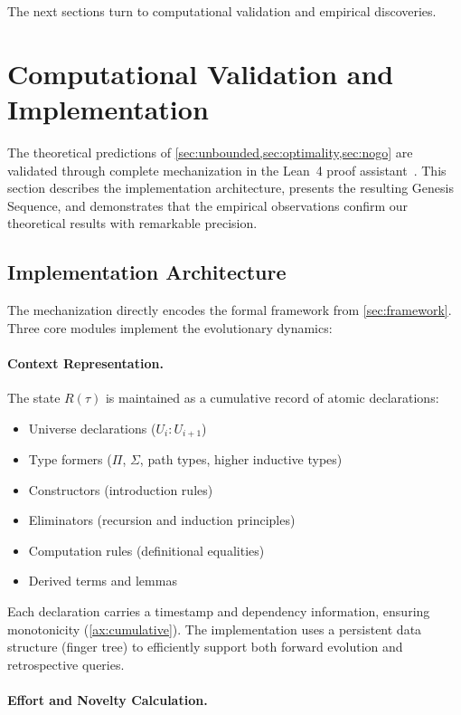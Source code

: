 \documentclass[11pt]{article}
\theoremstyle{definition}
\theoremstyle{remark}
\begin{document}
The next sections turn to computational validation and empirical discoveries.

\section{Computational Validation and Implementation}
\label{sec:implementation}

The theoretical predictions of \cref{sec:unbounded,sec:optimality,sec:nogo} are validated through complete mechanization in the Lean~4 proof assistant~\cite{demoura2021lean}. This section describes the implementation architecture, presents the resulting Genesis Sequence, and demonstrates that the empirical observations confirm our theoretical results with remarkable precision.

\subsection{Implementation Architecture}

The mechanization directly encodes the formal framework from \cref{sec:framework}. Three core modules implement the evolutionary dynamics:

\paragraph{Context Representation.}

The state $R(\tau)$ is maintained as a cumulative record of atomic declarations:
\begin{itemize}
\item Universe declarations ($U_i : U_{i+1}$)
\item Type formers ($\Pi$, $\Sigma$, path types, higher inductive types)
\item Constructors (introduction rules)
\item Eliminators (recursion and induction principles)
\item Computation rules (definitional equalities)
\item Derived terms and lemmas
\end{itemize}

Each declaration carries a timestamp and dependency information, ensuring monotonicity (\cref{ax:cumulative}). The implementation uses a persistent data structure (finger tree) to efficiently support both forward evolution and retrospective queries.

\paragraph{Effort and Novelty Calculation.}
\end{document}
